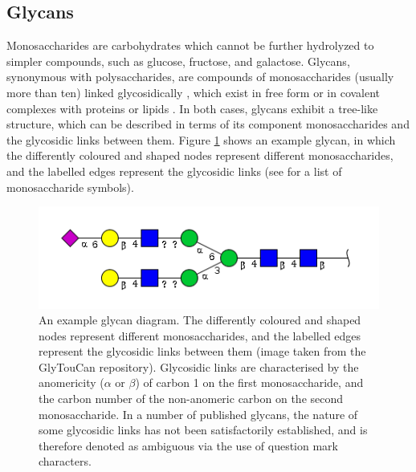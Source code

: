 \documentclass[12pt,a4paper]{article}
\begin{document}
\subsection{Glycans}
\label{sec:glycans_description}
Monosaccharides are carbohydrates which cannot be further hydrolyzed to simpler compounds, such as glucose, fructose, and galactose. Glycans, synonymous with polysaccharides, are compounds of monosaccharides (usually more than ten) linked glycosidically \citep{mcnaught1997compendium}, which exist in free form or in covalent complexes with proteins or lipids \citep{doi:10.1093/bioinformatics/btm090}. In both cases, glycans exhibit a tree-like structure, which can be described in terms of its component monosaccharides and the glycosidic links between them. Figure \ref{fig:example_glycan} shows an example glycan, in which the differently coloured and shaped nodes represent different monosaccharides, and the labelled edges represent the glycosidic links (see  for a list of monosaccharide symbols).

\begin{figure}[H]
\centering 
\includegraphics[scale=0.8]{images/glycan_G31576LD.png} 
\caption{An example glycan diagram. The differently coloured and shaped nodes represent different monosaccharides, and the labelled edges represent the glycosidic links between them (image taken from the GlyTouCan repository\protect\footnotemark). Glycosidic links are characterised by the anomericity ($\alpha$ or $\beta$) of carbon 1 on the first monosaccharide, and the carbon number of the non-anomeric carbon on the second monosaccharide. In a number of published glycans, the nature of some glycosidic links has not been satisfactorily established, and is therefore denoted as ambiguous via the use of question mark characters.}
\label{fig:example_glycan}
\end{figure}

\end{document}
